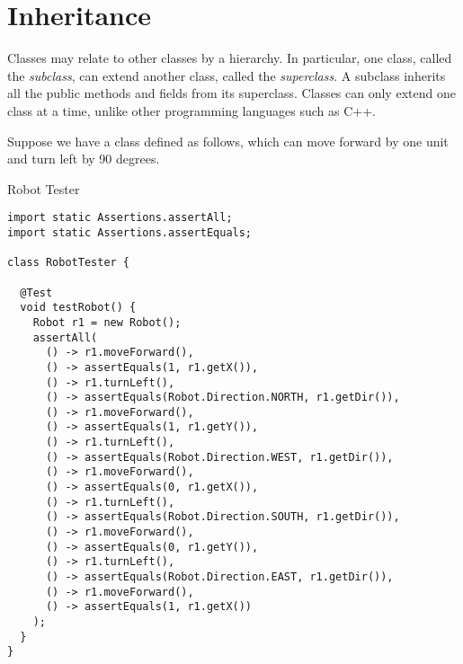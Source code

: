 \section{Inheritance}

Classes may relate to other classes by a hierarchy. In particular, one class, called the \textit{subclass}, can extend another class, called the \textit{superclass}. A subclass inherits all the public methods and fields from its superclass. Classes can only extend one class at a time, unlike other programming languages such as C++. 

\example Suppose we have a  class defined as follows, which can move forward by one unit and turn left by 90 degrees.

\begin{cl}{Robot Tester}
\begin{lstlisting}[language=MyJava]
import static Assertions.assertAll;
import static Assertions.assertEquals;

class RobotTester {

  @Test
  void testRobot() {
    Robot r1 = new Robot();
    assertAll(
      () -> r1.moveForward(),
      () -> assertEquals(1, r1.getX()),
      () -> r1.turnLeft(),
      () -> assertEquals(Robot.Direction.NORTH, r1.getDir()),
      () -> r1.moveForward(),
      () -> assertEquals(1, r1.getY()),
      () -> r1.turnLeft(),
      () -> assertEquals(Robot.Direction.WEST, r1.getDir()),
      () -> r1.moveForward(),
      () -> assertEquals(0, r1.getX()),
      () -> r1.turnLeft(),
      () -> assertEquals(Robot.Direction.SOUTH, r1.getDir()),
      () -> r1.moveForward(),
      () -> assertEquals(0, r1.getY()),
      () -> r1.turnLeft(),
      () -> assertEquals(Robot.Direction.EAST, r1.getDir()),
      () -> r1.moveForward(),
      () -> assertEquals(1, r1.getX())
    );
  }
}
\end{lstlisting}
\end{cl}

